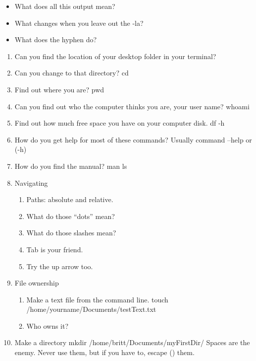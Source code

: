\documentclass[
  letterpaper,
  DIV=11,
  numbers=noendperiod]{scrreprt}
\providecommand{\tightlist}{%
  \setlength{\itemsep}{0pt}\setlength{\parskip}{0pt}}\usepackage{longtable,booktabs,array}
\begin{document}
\begin{itemize}
\tightlist
\item
  What does all this output mean?
\item
  What changes when you leave out the -la?
\item
  What does the hyphen do?
\end{itemize}

\begin{enumerate}
\def\labelenumi{\arabic{enumi}.}
\setcounter{enumi}{1}
\tightlist
\item
  Can you find the location of your desktop folder in your terminal?
\item
  Can you change to that directory? cd
\item
  Find out where you are? pwd
\item
  Can you find out who the computer thinks you are, your user name?
  whoami
\item
  Find out how much free space you have on your computer disk. df -h
\item
  How do you get help for most of these commands? Usually command --help
  or (-h)
\item
  How do you find the manual? man ls
\item
  Navigating

  \begin{enumerate}
  \def\labelenumii{\arabic{enumii}.}
  \tightlist
  \item
    Paths: absolute and relative.
  \item
    What do those ``dots'' mean?
  \item
    What do those slashes mean?
  \item
    Tab is your friend.
  \item
    Try the up arrow too.
  \end{enumerate}
\item
  File ownership

  \begin{enumerate}
  \def\labelenumii{\arabic{enumii}.}
  \tightlist
  \item
    Make a text file from the command line. touch
    /home/yourname/Documents/testText.txt
  \item
    Who owns it?
  \end{enumerate}
\item
  Make a directory mkdir /home/britt/Documents/myFirstDir/ Spaces are
  the enemy. Never use them, but if you have to, escape () them.
\end{enumerate}
\end{document}
